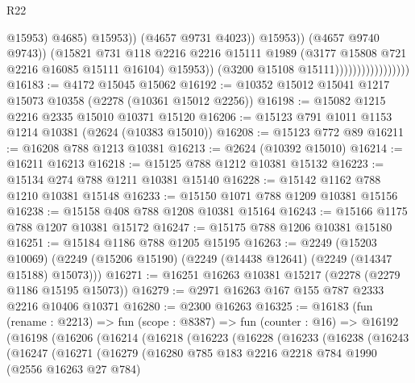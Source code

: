 \begin{lexlean}{R22}
\begin{coremodule}
                                                      @15953)
                                                    @4685)
                                                  @15953))
                                              (@4657 @9731 @4023))
                                            @15953))
                                        (@4657 @9740 @9743))
                                      (@15821
                                        @731
                                        @118
                                        @2216
                                        @2216
                                        @15111
                                        @1989
                                        (@3177 @15808 @721 @2216 @16085 @15111 @16104)
                                        @15953))
                                    (@3200 @15108 @15111)))))))))))))))))
@16183 := @4172 @15045 @15062
@16192 := @10352 @15012 @15041 @1217 @15073 @10358 (@2278 (@10361 @15012 @2256))
@16198 := @15082 @1215 @2216 @2335 @15010 @10371 @15120
@16206 := @15123 @791 @1011 @1153 @1214 @10381 (@2624 (@10383 @15010))
@16208 := @15123 @772 @89
@16211 := @16208 @788 @1213 @10381
@16213 := @2624 (@10392 @15010)
@16214 := @16211 @16213
@16218 := @15125 @788 @1212 @10381 @15132
@16223 := @15134 @274 @788 @1211 @10381 @15140
@16228 := @15142 @1162 @788 @1210 @10381 @15148
@16233 := @15150 @1071 @788 @1209 @10381 @15156
@16238 := @15158 @408 @788 @1208 @10381 @15164
@16243 := @15166 @1175 @788 @1207 @10381 @15172
@16247 := @15175 @788 @1206 @10381 @15180
@16251 := @15184 @1186 @788 @1205 @15195
@16263 := @2249
    (@15203 @10069)
    (@2249 (@15206 @15190) (@2249 (@14438 @12641) (@2249 (@14347 @15188) @15073)))
@16271 := @16251 @16263 @10381 @15217 (@2278 (@2279 @1186 @15195 @15073))
@16279 := @2971 @16263 @167 @155 @787 @2333 @2216 @10406 @10371
@16280 := @2300 @16263
@16325 := @16183
    (fun (rename : @2213) =>
    fun (scope : @8387) =>
    fun (counter : @16) =>
    @16192
      (@16198
        (@16206
          (@16214
            (@16218
              (@16223
                (@16228
                  (@16233
                    (@16238
                      (@16243
                        (@16247
                          (@16271
                            (@16279
                              (@16280
                                @785
                                @183
                                @2216
                                @2218
                                @784
                                @1990
                                (@2556 @16263 @27 @784)

\end{coremodule}
\end{lexlean}
